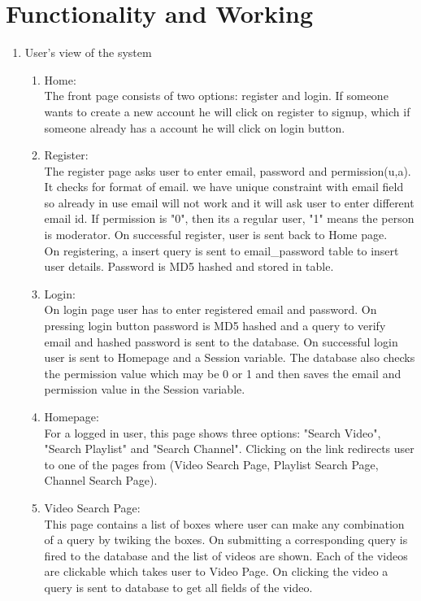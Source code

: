\documentclass[10pt]{article}
\begin{document}
	\section{Functionality and Working}
	\begin{enumerate}
		\item User's view of the system
		\begin{enumerate}
			\item Home:\\
			The front page consists of two options: register and login. 
			If someone wants to create a new account he will click on register to signup, which if someone already has a account he will click on login button.
			\item Register: \\
			The register page asks user to enter email, password and permission(u,a). It checks for format of email. we have unique constraint with email field so already in use email will not work and it will ask user to enter different email id. If permission is "0", then its a regular user, "1" means the person is moderator. On successful register, user is sent back to Home page.\\
			On registering, a insert query is sent to email\_password table to insert user details. Password is MD5 hashed and stored in table.
			\item Login:\\
			On login page user has to enter registered email and password. On pressing login button password is MD5 hashed and a query to verify email and hashed password is sent to the database. On successful login user is sent to Homepage and a Session variable. The database also checks the permission value which may be 0 or 1 and then saves the email and permission value in the Session variable.
			\item Homepage:\\
			For a logged in user, this page shows three options: "Search Video", "Search Playlist" and "Search Channel".
			Clicking on the link redirects user to one of the pages from (Video Search Page, Playlist Search Page, Channel Search Page).\\
			\item Video Search Page: \\
			This page contains a list of boxes where user can make any combination of a query by twiking the boxes. On submitting a corresponding query is fired to the database and the list of videos are shown. Each of the videos are clickable which takes user to Video Page. On clicking the video a query is sent to database to get all fields of the video.

\end{enumerate}
\end{enumerate}
\end{document}

